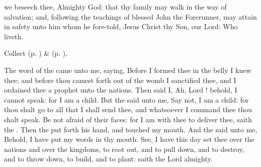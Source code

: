 \collect\label{JohnBaptistVigilCollect}
 we beseech thee, Almighty God: that thy family may walk in the way of salvation; and, following the teachings of blessed John the Forerunner, may attain in safety unto him whom he fore-told, Jesus Christ thy Son, our Lord: Who liveth.

\begin{rubric}
 Collect  (p. \pageref{EtheldraCollect}) \&   (p. \pageref{SPSaints}).
\end{rubric}

 The word of the  came unto me, saying, Before I formed thee in the belly I knew thee; and before thou camest forth out of the womb I sanctified thee, and I ordained thee a prophet unto the nations. Then said I, Ah, Lord ! behold, I cannot speak: for I am a child. But the  said unto me, Say not, I am a child: for thou shalt go to all that I shall send thee, and whatsoever I command thee thou shalt speak. Be not afraid of their faces: for I am with thee to deliver thee, saith the . Then the  put forth his hand, and touched my mouth. And the  said unto me, Behold, I have put my words in thy mouth. See, I have this day set thee over the nations and over the kingdoms, to root out, and to pull down, and to destroy, and to throw down, to build, and to plant: saith the Lord almighty.


